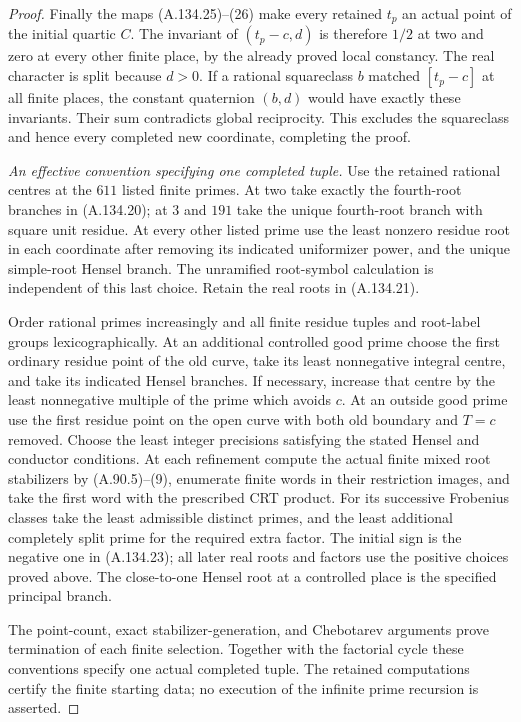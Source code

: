 \begin{proof}
Finally the maps (A.134.25)--(26) make every
retained $t_p$ an actual point of the initial
quartic $C$.
The invariant of $(t_p-c,d)$ is therefore $1/2$
at two and zero at every other finite place,
by the already proved local constancy.
The real character is split because $d>0$.
If a rational squareclass $b$ matched
$[t_p-c]$ at all finite places, the constant
quaternion $(b,d)$ would have exactly these
invariants.
Their sum contradicts global reciprocity.
This excludes the squareclass and hence every
completed new coordinate, completing the proof.

\emph{An effective convention specifying one completed tuple.}
Use the retained rational centres at the $611$
listed finite primes.
At two take exactly the fourth-root branches
in (A.134.20); at $3$ and $191$ take the unique
fourth-root branch with square unit residue.
At every other listed prime use the least
nonzero residue root in each coordinate after
removing its indicated uniformizer power,
and the unique simple-root Hensel branch.
The unramified root-symbol calculation is
independent of this last choice.
Retain the real roots in (A.134.21).

Order rational primes increasingly and all
finite residue tuples and root-label groups
lexicographically.
At an additional controlled good prime choose
the first ordinary residue point of the
old curve, take its least nonnegative integral
centre, and take its indicated Hensel branches.
If necessary, increase that centre by the
least nonnegative multiple of the prime
which avoids $c$.
At an outside good prime use the first
residue point on the open curve with both
old boundary and $T=c$ removed.
Choose the least integer precisions satisfying
the stated Hensel and conductor conditions.
At each refinement compute the actual finite
mixed root stabilizers by (A.90.5)--(9),
enumerate finite words in their restriction
images, and take the first word with the
prescribed CRT product.
For its successive Frobenius classes take
the least admissible distinct primes, and
the least additional completely split prime
for the required extra factor.
The initial sign is the negative one in
(A.134.23); all later real roots and factors
use the positive choices proved above.
The close-to-one Hensel root at a controlled
place is the specified principal branch.

The point-count, exact stabilizer-generation,
and Chebotarev arguments prove termination
of each finite selection.
Together with the factorial cycle these
conventions specify one actual completed
tuple.  The retained computations certify
the finite starting data; no execution of
the infinite prime recursion is asserted.
\end{proof}

